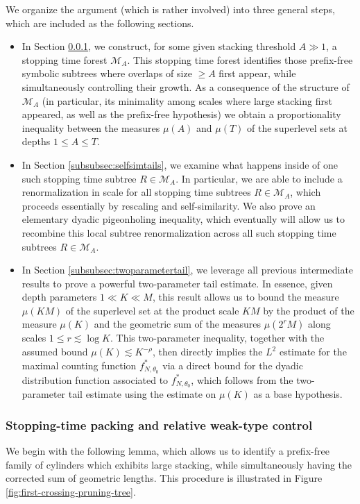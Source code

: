 \documentclass[12pt]{amsart}
\numberwithin{equation}{section}
\begin{document}
We organize the argument (which is rather involved) into three general steps, which are included as the following sections.
\begin{itemize}
    \item In Section \ref{subsubsec:stoppingtime}, we construct, for some given stacking threshold $A \gg 1$, a stopping time forest $\mathscr{M}_A$. This stopping time forest identifies those prefix-free symbolic subtrees where overlaps of size $\geq A$ first appear, while simultaneously controlling their growth. As a consequence of the structure of $\mathscr{M}_A$ (in particular, its minimality among scales where large stacking first appeared, as well as the prefix-free hypothesis) we obtain a proportionality inequality between the measures $\mu(A)$ and $\mu(T)$ of the superlevel sets at depths $1 \leq A \leq T$.
    \medskip
    \item In Section \ref{subsubsec:selfsimtails}, we examine what happens inside of one such stopping time subtree $R \in \mathscr{M}_A$. In particular, we are able to include a renormalization in scale for all stopping time subtrees $R \in \mathscr{M}_A$, which proceeds essentially by rescaling and self-similarity. We also prove an elementary dyadic pigeonholing inequality, which eventually will allow us to recombine this local subtree renormalization across all such stopping time subtrees $R \in \mathscr{M}_A$.
    \medskip
    \item In Section \ref{subsubsec:twoparametertail}, we leverage all previous intermediate results to prove a powerful two-parameter tail estimate. In essence, given depth parameters $1 \ll K \ll M$, this result allows us to bound the measure $\mu(KM)$ of the superlevel set at the product scale $KM$ by the product of the measure $\mu (K)$ and the geometric sum of the measures $\mu(2^r M)$ along scales $1 \leq r \lesssim \log K$. This two-parameter inequality, together with the assumed bound $\mu(K) \lesssim K^{-\rho}$, then directly implies the $L^2$ estimate for the maximal counting function $f_{N,\theta_0}^*$ via a direct bound for the dyadic distribution function associated to $f_{N,\theta_0}^*$, which follows from the two-parameter tail estimate using the estimate on $\mu(K)$ as a base hypothesis.
\end{itemize}



\subsubsection{Stopping-time packing and relative weak-type control}\label{subsubsec:stoppingtime}
We begin with the following lemma, which allows us to identify a prefix-free family of cylinders which exhibits large stacking, while simultaneously having the corrected sum of geometric lengths. This procedure is illustrated in Figure \ref{fig:first-crossing-pruning-tree}.
\end{document}
